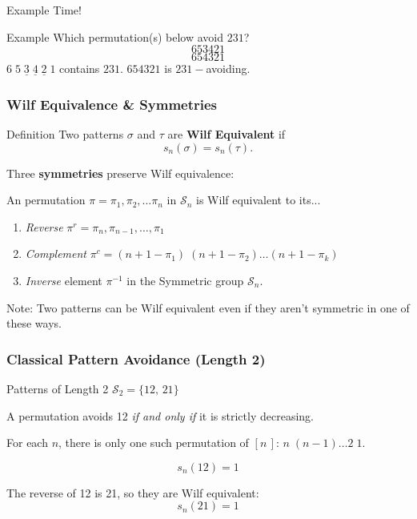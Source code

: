 \documentclass{beamer}  %
\begin{document}
\begin{frame}{Example Time!}
    \begin{alertblock}{Example}
    Which permutation(s) below avoid $231$?
    $$653421$$
    $$654321$$
    \vspace{1mm}
    \pause
    $6\;5\;\underline{3}\;\underline{4}\;\underline{2}\;1$ contains $231$. $654321$ is $231-$avoiding.
    \end{alertblock}
\end{frame}


\begin{frame} 
\frametitle{Wilf Equivalence \& Symmetries}

\begin{block}{Definition}
    Two patterns $\sigma$ and $\tau$ are \textbf{Wilf Equivalent} if $$s_n(\sigma)=s_n(\tau).$$
\end{block}
Three \textbf{symmetries} preserve Wilf equivalence:

An permutation $\pi=\pi_1,\pi_2,\dots\pi_n$ in $\mathcal S_n$ is Wilf equivalent to its...
\begin{enumerate}
    \item \textit{Reverse} $\pi^r=\pi_n,\pi_{n-1},\dots,\pi_1$
    \item \textit{Complement} $\pi^c=(n+1-\pi_1)\;(n+1-\pi_2)\dots(n+1-\pi_k)$
    \item \textit{Inverse} element $\pi^{-1}$ in the Symmetric group $\mathcal S_n$.
\end{enumerate}

\vspace{5mm}
\alert{Note}: Two patterns can be Wilf equivalent even if they aren't symmetric in one of these ways.
\end{frame}


\begin{frame} 
\frametitle{Classical Pattern Avoidance (Length 2)}

\begin{block}{Patterns of Length 2}
  $\mathcal S_2=\{12,\,21\}$
\end{block}
\pause
A permutation avoids 12 \textit{if and only if} it is strictly decreasing.

For each $n$, there is only one such permutation of $[n\,]$: $n\;(n-1)\dots2\;1.$

\pause

$$s_n(12)=1$$

\pause

The reverse of 12 is 21, so they are Wilf equivalent:
$$s_n(21)=1$$

\end{frame}
\end{document}
